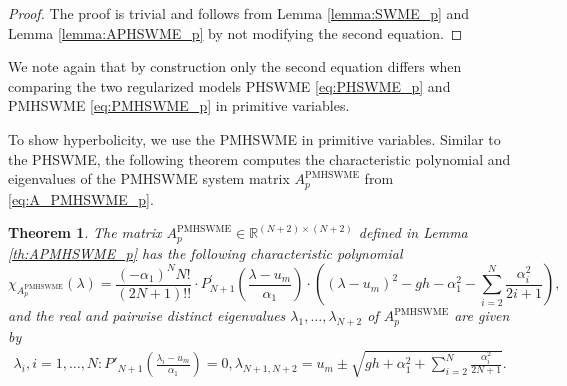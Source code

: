 \documentclass[a4paper, 11pt]{article}
\newtheorem{theorem}{Theorem}
\begin{document}
\begin{proof}
    The proof is trivial and follows from Lemma \ref{lemma:SWME_p} and Lemma \ref{lemma:APHSWME_p} by not modifying the second equation.
\end{proof}
We note again that by construction only the second equation differs when comparing the two regularized models PHSWME \eqref{eq:PHSWME_p} and PMHSWME \eqref{eq:PMHSWME_p} in primitive variables.

To show hyperbolicity, we use the PMHSWME in primitive variables. Similar to the PHSWME, the following theorem computes the characteristic polynomial and  eigenvalues of the PMHSWME system matrix $A^{\textrm{PMHSWME}}_{p}$ from \eqref{eq:A_PMHSWME_p}.

\begin{theorem}\label{th:APMHSWME_p_chi}
    The matrix $A^{\textrm{PMHSWME}}_{p} \in \mathbb{R}^{(N+2)\times(N+2)}$ defined in Lemma \ref{th:APMHSWME_p} has the following characteristic polynomial
    \begin{equation}\label{eq:APMHSWME_p_char_poly}
        \chi_{A^{\textrm{PMHSWME}}_{p}}(\lambda) = \frac{(-\alpha_1)^NN!}{(2N+1)!!} \cdot P^{'}_{N+1}\left(\frac{\lambda-u_m}{\alpha_1}\right) \cdot \left( \left( \lambda - u_m \right)^2 - gh - \alpha_1^2 - \sum\limits_{i=2}^N\frac{\alpha_i^2}{2i+1}\right),
    \end{equation}
    and the real and pairwise distinct eigenvalues $\lambda_1, \ldots, \lambda_{N+2}$ of $A^{\textrm{PMHSWME}}_{p}$ are given by
    \begin{eqnarray}\label{eq:APMHSWME_p_EV}
        \lambda_i, i=1,\ldots, N: P'_{N+1}\left(\frac{\lambda_i - u_m}{\alpha_1}\right)=0,
        \lambda_{N+1,N+2} = u_m \pm \sqrt{gh + \alpha_1^2 + \sum\limits_{i=2}^N\frac{\alpha_i^2}{2N+1}}.
    \end{eqnarray}
\end{theorem}
\end{document}

